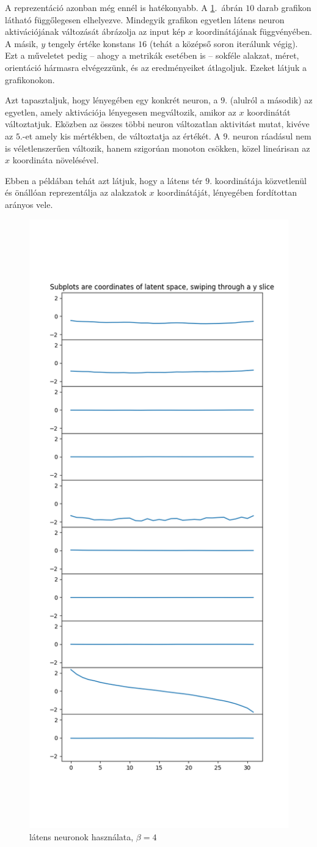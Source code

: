 A reprezentáció azonban még ennél is hatékonyabb. A \ref{b4-splice}.~ábrán $10$ darab grafikon látható függőlegesen elhelyezve. Mindegyik grafikon egyetlen látens neuron aktivációjának változását ábrázolja az input kép $x$ koordinátájának függvényében. A másik, $y$ tengely értéke konstans $16$ (tehát a középső soron iterálunk végig). Ezt a műveletet pedig -- ahogy a metrikák esetében is -- sokféle alakzat, méret, orientáció hármasra elvégezzünk, és az eredményeiket átlagoljuk. Ezeket látjuk a grafikonokon. 

Azt tapasztaljuk, hogy lényegében egy konkrét neuron, a $9$. (alulról a második) az egyetlen, amely aktivációja lényegesen megváltozik, amikor az $x$ koordinátát változtatjuk. Eközben az összes többi neuron változatlan aktivitást mutat, kivéve az $5.$-et amely kis mértékben, de változtatja az értékét. A $9$. neuron ráadásul nem is véletlenszerűen változik, hanem szigorúan monoton csökken, közel lineárisan az $x$ koordináta növelésével.

Ebben a példában tehát azt látjuk, hogy a látens tér $9$. koordinátája közvetlenül és önállóan reprezentálja  az alakzatok $x$ koordinátáját, lényegében fordítottan arányos vele.

\begin{figure}[h!]
\begin{center}
  
  \includegraphics[width=0.5\linewidth]{slice_y16_all_coordsb4.png}
  \caption{látens neuronok használata, $\beta=4$}\label{b4-splice}
\end{center}
\end{figure}

